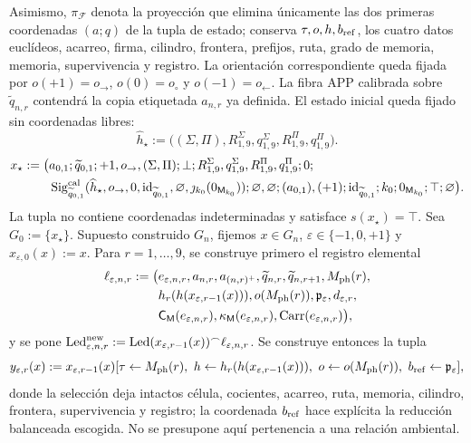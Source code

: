 Asimismo, \(\pi_{\mathcal F}\) denota la proyección que elimina únicamente
las dos primeras coordenadas \((a;q)\) de la tupla de estado; conserva
\(\tau,o,h,b_{\rm ref}\), los cuatro datos euclídeos, acarreo, firma,
cilindro, frontera, prefijos, ruta, grado de memoria, memoria, supervivencia y
registro.
La orientación correspondiente queda fijada por
\(o(+1)=o_{\rightarrow}\), \(o(0)=o_{\circ}\) y
\(o(-1)=o_{\leftarrow}\).
La fibra APP calibrada sobre \(\widetilde q_{n,r}\) contendrá la copia etiquetada
\(a_{n,r}\) ya definida. El estado inicial queda fijado sin coordenadas libres:
\[
 \widehat h_\star:=
 \bigl((\Sigma,\Pi),R^\Sigma_{1,9},q^\Sigma_{1,9},
       R^\Pi_{1,9},q^\Pi_{1,9}\bigr).
\]
\begin{equation}
\begin{aligned}
 x_\star:=\bigl(&a_{0,1};\widetilde q_{0,1};
 +1,o_{\rightarrow},(\Sigma,\Pi);\bot;
 R^\Sigma_{1,9},q^\Sigma_{1,9},R^\Pi_{1,9},q^\Pi_{1,9};0;\\
 &\operatorname{Sig}^{\rm cal}_{\widetilde q_{0,1}}
       (\widehat h_\star,o_{\rightarrow},0,
        \operatorname{id}_{\widetilde q_{0,1}},\varnothing,
        \jmath_{k_0}(0_{\mathsf M_{k_0}}));
 \varnothing,\varnothing;
 (a_{0,1}),(+1);\operatorname{id}_{\widetilde q_{0,1}};
 k_0;0_{\mathsf M_{k_0}};\top;\varnothing\bigr).
\end{aligned}
\label{hmtfg:eq:estado-inicial-calibrado-ch}
\end{equation}
La tupla no contiene coordenadas indeterminadas y satisface
\(s(x_\star)=\top\). Sea \(G_0:=\{x_\star\}\).
Supuesto construido \(G_n\), fijemos \(x\in G_n\),
\(\varepsilon\in\{-1,0,+1\}\) y
\(x_{\varepsilon,0}(x):=x\). Para \(r=1,\ldots,9\), se construye primero
el registro elemental
\begin{equation}
\begin{aligned}
 \ell_{\varepsilon,n,r}:=\bigl(&e_{\varepsilon,n,r},a_{n,r},a_{(n,r)^+},
 \widetilde q_{n,r},\widetilde q_{n,r+1},M_{\rm ph}(r),\\
 &h_r(h(x_{\varepsilon,r-1}(x))),o(M_{\rm ph}(r)),\mathfrak p_\varepsilon,
 d_{\varepsilon,r},\\
 &\mathsf C_{\mathsf M}(e_{\varepsilon,n,r}),
 \kappa_{\mathsf M}(e_{\varepsilon,n,r}),
 \operatorname{Carr}(e_{\varepsilon,n,r})\bigr),
\end{aligned}
 \label{hmtfg:eq:registro-elemental-ext-ch}
\end{equation}
y se pone
\(\operatorname{Led}^{\rm new}_{\varepsilon,n,r}:=
\operatorname{Led}(x_{\varepsilon,r-1}(x))^\frown
\ell_{\varepsilon,n,r}\). Se construye entonces la tupla
\begin{equation}
 y_{\varepsilon,r}(x):=
 x_{\varepsilon,r-1}(x)
 [\tau\leftarrow M_{\rm ph}(r),\
  h\leftarrow h_r(h(x_{\varepsilon,r-1}(x))),\
  o\leftarrow o(M_{\rm ph}(r)),\
  b_{\rm ref}\leftarrow\mathfrak p_\varepsilon],
 \label{hmtfg:eq:tupla-sel-cal-ch}
\end{equation}
donde la selección deja intactos célula, cocientes, acarreo, ruta, memoria,
cilindro, frontera, supervivencia y registro; la coordenada
\(b_{\rm ref}\) hace explícita la reducción balanceada escogida. No se presupone aquí
pertenencia a una relación ambiental.


